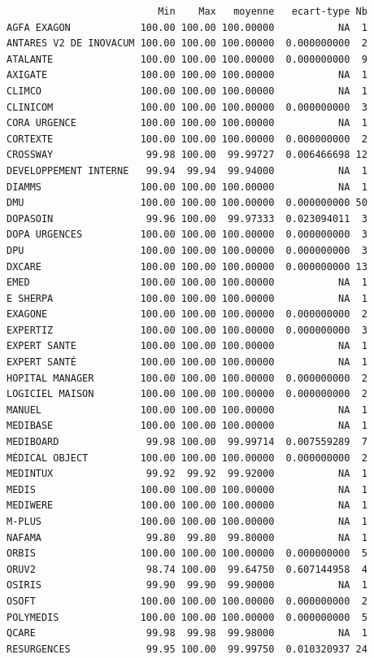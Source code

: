 \documentclass[]{article}
\begin{document}
\begin{verbatim}
                          Min    Max   moyenne   ecart-type Nb
AGFA EXAGON            100.00 100.00 100.00000           NA  1
ANTARES V2 DE INOVACUM 100.00 100.00 100.00000  0.000000000  2
ATALANTE               100.00 100.00 100.00000  0.000000000  9
AXIGATE                100.00 100.00 100.00000           NA  1
CLIMCO                 100.00 100.00 100.00000           NA  1
CLINICOM               100.00 100.00 100.00000  0.000000000  3
CORA URGENCE           100.00 100.00 100.00000           NA  1
CORTEXTE               100.00 100.00 100.00000  0.000000000  2
CROSSWAY                99.98 100.00  99.99727  0.006466698 12
DEVELOPPEMENT INTERNE   99.94  99.94  99.94000           NA  1
DIAMMS                 100.00 100.00 100.00000           NA  1
DMU                    100.00 100.00 100.00000  0.000000000 50
DOPASOIN                99.96 100.00  99.97333  0.023094011  3
DOPA URGENCES          100.00 100.00 100.00000  0.000000000  3
DPU                    100.00 100.00 100.00000  0.000000000  3
DXCARE                 100.00 100.00 100.00000  0.000000000 13
EMED                   100.00 100.00 100.00000           NA  1
E SHERPA               100.00 100.00 100.00000           NA  1
EXAGONE                100.00 100.00 100.00000  0.000000000  2
EXPERTIZ               100.00 100.00 100.00000  0.000000000  3
EXPERT SANTE           100.00 100.00 100.00000           NA  1
EXPERT SANTÉ           100.00 100.00 100.00000           NA  1
HOPITAL MANAGER        100.00 100.00 100.00000  0.000000000  2
LOGICIEL MAISON        100.00 100.00 100.00000  0.000000000  2
MANUEL                 100.00 100.00 100.00000           NA  1
MEDIBASE               100.00 100.00 100.00000           NA  1
MEDIBOARD               99.98 100.00  99.99714  0.007559289  7
MÉDICAL OBJECT         100.00 100.00 100.00000  0.000000000  2
MEDINTUX                99.92  99.92  99.92000           NA  1
MEDIS                  100.00 100.00 100.00000           NA  1
MEDIWERE               100.00 100.00 100.00000           NA  1
M-PLUS                 100.00 100.00 100.00000           NA  1
NAFAMA                  99.80  99.80  99.80000           NA  1
ORBIS                  100.00 100.00 100.00000  0.000000000  5
ORUV2                   98.74 100.00  99.64750  0.607144958  4
OSIRIS                  99.90  99.90  99.90000           NA  1
OSOFT                  100.00 100.00 100.00000  0.000000000  2
POLYMEDIS              100.00 100.00 100.00000  0.000000000  5
QCARE                   99.98  99.98  99.98000           NA  1
RESURGENCES             99.95 100.00  99.99750  0.010320937 24

\end{verbatim}
\end{document}
